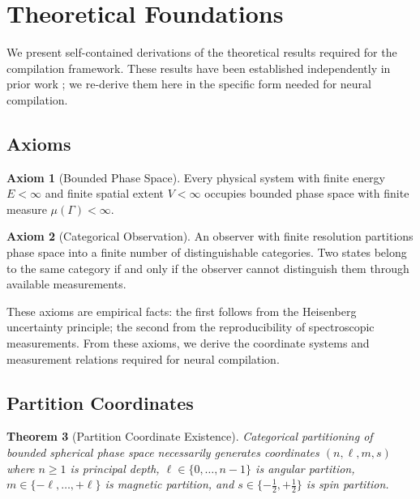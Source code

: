 \documentclass[11pt,a4paper]{article}
\newtheorem{theorem}{Theorem}[section]
\theoremstyle{definition}
\newtheorem{axiom}[theorem]{Axiom}
\theoremstyle{remark}
\begin{document}
\section{Theoretical Foundations}
\label{sec:foundations}

We present self-contained derivations of the theoretical results required for the compilation framework. These results have been established independently in prior work \cite{oxygen2024, partition2024, rpi2024, multimodal2024}; we re-derive them here in the specific form needed for neural compilation.

\subsection{Axioms}

\begin{axiom}[Bounded Phase Space]
\label{ax:bounded}
Every physical system with finite energy $E < \infty$ and finite spatial extent $V < \infty$ occupies bounded phase space with finite measure $\mu(\Gamma) < \infty$.
\end{axiom}

\begin{axiom}[Categorical Observation]
\label{ax:categorical}
An observer with finite resolution partitions phase space into a finite number of distinguishable categories. Two states belong to the same category if and only if the observer cannot distinguish them through available measurements.
\end{axiom}

These axioms are empirical facts: the first follows from the Heisenberg uncertainty principle; the second from the reproducibility of spectroscopic measurements. From these axioms, we derive the coordinate systems and measurement relations required for neural compilation.

\subsection{Partition Coordinates}

\begin{theorem}[Partition Coordinate Existence]
\label{thm:partition_coords}
Categorical partitioning of bounded spherical phase space necessarily generates coordinates $(n, \ell, m, s)$ where $n \geq 1$ is principal depth, $\ell \in \{0, \ldots, n-1\}$ is angular partition, $m \in \{-\ell, \ldots, +\ell\}$ is magnetic partition, and $s \in \{-\frac{1}{2}, +\frac{1}{2}\}$ is spin partition.
\end{theorem}
\end{document}
